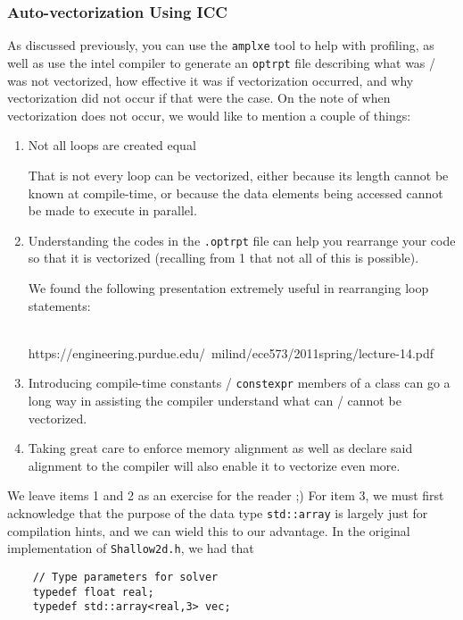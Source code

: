 \subsubsection{Auto-vectorization Using ICC}
\label{sec-tune-vectorizing-auto-vectorizing}

As discussed previously, you can use the \texttt{amplxe} tool to help with profiling, as well as use the intel compiler to generate an \texttt{optrpt} file describing what was / was not vectorized, how effective it was if vectorization occurred, and why vectorization did not occur if that were the case.  On the note of when vectorization does not occur, we would like to mention a couple of things:

\begin{enumerate}[1.]
    \item Not all loops are created equal

    That is not every loop can be vectorized, either because its length cannot be known at compile-time, or because the data elements being accessed cannot be made to execute in parallel.

    \item Understanding the codes in the \texttt{.optrpt} file can help you rearrange your code so that it is vectorized (recalling from 1 that not all of this is possible).

    We found the following presentation extremely useful in rearranging loop statements:\\\\ \centerline{https://engineering.purdue.edu/~milind/ece573/2011spring/lecture-14.pdf}

    \item Introducing compile-time constants / \texttt{constexpr} members of a class can go a long way in assisting the compiler understand what can / cannot be vectorized.

    \item Taking great care to enforce memory alignment as well as declare said alignment to the compiler will also enable it to vectorize even more.
\end{enumerate}

We leave items 1 and 2 as an exercise for the reader ;)  For item 3, we must first acknowledge that the purpose of the data type \texttt{std::array} is largely just for compilation hints, and we can wield this to our advantage.  In the original implementation of \texttt{Shallow2d.h}, we had that

{\tiny
\begin{lstlisting}
    // Type parameters for solver
    typedef float real;
    typedef std::array<real,3> vec;
\end{lstlisting}
}

